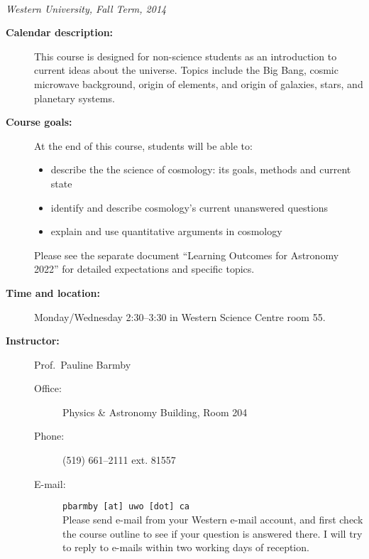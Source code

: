 \documentclass[12pt]{article}
\begin{document}
\thispagestyle{empty}

\begin{center}
\\
\vspace{0.1in}
{\it Western University, Fall Term, 2014}
\end{center}

\vspace{0.0in}

\begin{description}

\item[\bf Calendar description:] This course is designed for non-science students as an introduction to current ideas about the universe. Topics include the Big Bang, cosmic microwave background, origin of elements, and origin of galaxies, stars, and planetary systems.

\item[\bf Course goals:] \hspace{1cm}   

At the end of this course, students will be able to:
\begin{itemize}
\item describe the the science of cosmology: its goals, methods and current state
\item identify and describe cosmology's current unanswered questions 
\item explain and use quantitative arguments in cosmology 
\end{itemize}
Please see the separate document ``Learning Outcomes for Astronomy 2022'' for 
detailed expectations and specific topics. 

\item[\bf Time and location:] Monday/Wednesday 2:30--3:30 in Western Science Centre room 55.

\item[\bf Instructor:]  Prof.\ Pauline Barmby 
 \begin{description}

   \item[Office:] Physics \& Astronomy Building, Room  204 

   \item[Phone:] (519) 661--2111 ext.   81557 

   \item[E-mail:]  \verb$pbarmby [at] uwo [dot] ca $\\
   Please send e-mail from your Western e-mail account, and first check the course outline to see if your question is answered there. 
   I will try to reply to e-mails within two working days of reception. 
   

\end{description}
\end{description}
\end{document}
